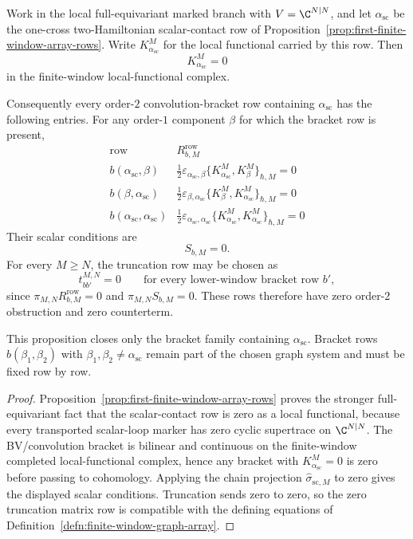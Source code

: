 \begin{prop}\label{prop:universal-scalar-contact-bracket-rows}
  Work in the local full-equivariant marked branch with \(V=\C^{N|N}\), and
  let \(\alpha_{\mathrm{sc}}\) be the one-cross two-Hamiltonian
  scalar-contact row of
  Proposition~\ref{prop:first-finite-window-array-rows}.  Write
  \(K^M_{\alpha_{\mathrm{sc}}}\) for the local functional carried by this
  row.  Then
  \[
    K^M_{\alpha_{\mathrm{sc}}}=0
  \]
  in the finite-window local-functional complex.

  Consequently every order-\(2\) convolution-bracket row containing
  \(\alpha_{\mathrm{sc}}\) has the following entries.  For any order-\(1\)
  component \(\beta\) for which the bracket row is present,
  \[
  \begin{array}{c|c}
    \text{row} & R^{\mathrm{row}}_{b,M} \\ \hline
    b(\alpha_{\mathrm{sc}},\beta) &
      \frac12\varepsilon_{\alpha_{\mathrm{sc}},\beta}
      \{K^M_{\alpha_{\mathrm{sc}}},K^M_{\beta}\}_{\hbar,M}=0\\
    b(\beta,\alpha_{\mathrm{sc}}) &
      \frac12\varepsilon_{\beta,\alpha_{\mathrm{sc}}}
      \{K^M_{\beta},K^M_{\alpha_{\mathrm{sc}}}\}_{\hbar,M}=0\\
    b(\alpha_{\mathrm{sc}},\alpha_{\mathrm{sc}}) &
      \frac12\varepsilon_{\alpha_{\mathrm{sc}},\alpha_{\mathrm{sc}}}
      \{K^M_{\alpha_{\mathrm{sc}}},
        K^M_{\alpha_{\mathrm{sc}}}\}_{\hbar,M}=0
  \end{array}
  \]
  Their scalar conditions are
  \[
    S_{b,M}=0.
  \]
  For every \(M\geq N\), the truncation row may be chosen as
  \[
    t^{M,N}_{b b'}=0
    \qquad
    \text{for every lower-window bracket row } b',
  \]
  since \(\pi_{M,N}R^{\mathrm{row}}_{b,M}=0\) and
  \(\pi_{M,N}S_{b,M}=0\).  These rows therefore have zero order-\(2\)
  obstruction and zero counterterm.

  This proposition closes only the bracket family containing
  \(\alpha_{\mathrm{sc}}\).  Bracket rows \(b(\beta_1,\beta_2)\) with
  \(\beta_1,\beta_2\neq\alpha_{\mathrm{sc}}\) remain part of the chosen
  graph system and must be fixed row by row.
\end{prop}

\begin{proof}
  Proposition~\ref{prop:first-finite-window-array-rows} proves the stronger
  full-equivariant fact that the scalar-contact row is zero as a local
  functional, because every transported scalar-loop marker has zero cyclic
  supertrace on \(\C^{N|N}\).  The BV/convolution bracket is bilinear and
  continuous on the finite-window completed local-functional complex, hence
  any bracket with \(K^M_{\alpha_{\mathrm{sc}}}=0\) is zero before passing to
  cohomology.  Applying the chain projection
  \(\widehat\sigma_{\mathrm{sc},M}\) to zero gives the displayed scalar
  conditions.  Truncation sends zero to zero, so the zero truncation matrix row is
  compatible with the defining equations of
  Definition~\ref{defn:finite-window-graph-array}.
\end{proof}

